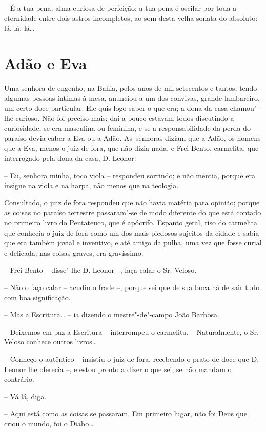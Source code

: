 -- É a tua pena, alma curiosa de perfeição; a tua pena é oscilar por
toda a eternidade entre dois astros incompletos, ao som desta velha
sonata do absoluto: lá, lá, lá\ldots{}

\chapter{Adão e Eva}

Uma senhora de engenho, na Bahia, pelos anos de mil setecentos e tantos,
tendo algumas pessoas íntimas à mesa, anunciou a um dos convivas, grande
lambareiro, um certo doce particular. Ele quis logo saber o que era; a
dona da casa chamou"-lhe curioso. Não foi preciso mais; daí a pouco
estavam todos discutindo a curiosidade, se era masculina ou feminina, e
se a responsabilidade da perda do paraíso devia caber a Eva ou a Adão.
As~senhoras diziam que a Adão, os homens que a Eva, menos o juiz de
fora, que não dizia nada, e Frei Bento, carmelita, que interrogado pela
dona da casa, D. Leonor:

-- Eu, senhora minha, toco viola -- respondeu sorrindo; e não mentia,
porque era insigne na viola e na harpa, não menos que na teologia.

Consultado, o juiz de fora respondeu que não havia matéria para opinião;
porque as coisas no paraíso terrestre passaram"-se de modo diferente do
que está contado no primeiro livro do Pentateuco, que é apócrifo.
Espanto geral, riso do carmelita que conhecia o juiz de fora como um dos
mais piedosos sujeitos da cidade e sabia que era também jovial e
inventivo, e até amigo da pulha, uma vez que fosse curial e delicada;
nas coisas graves, era gravíssimo.

-- Frei Bento -- disse"-lhe D. Leonor --, faça calar o Sr. Veloso.

-- Não o faço calar -- acudiu o frade --, porque sei que de sua boca há
de sair tudo com boa significação.

-- Mas a Escritura\ldots{} -- ia dizendo o mestre"-de"-campo João Barbosa.

-- Deixemos em paz a Escritura -- interrompeu o carmelita. --
Naturalmente, o Sr. Veloso conhece outros livros\ldots{}

-- Conheço o autêntico -- insistiu o juiz de fora, recebendo o prato de
doce que D. Leonor lhe oferecia --, e estou pronto a dizer o que sei, se
não mandam o contrário.

-- Vá lá, diga.

-- Aqui está como as coisas se passaram. Em primeiro lugar, não foi Deus
que criou o mundo, foi o Diabo\ldots{}

